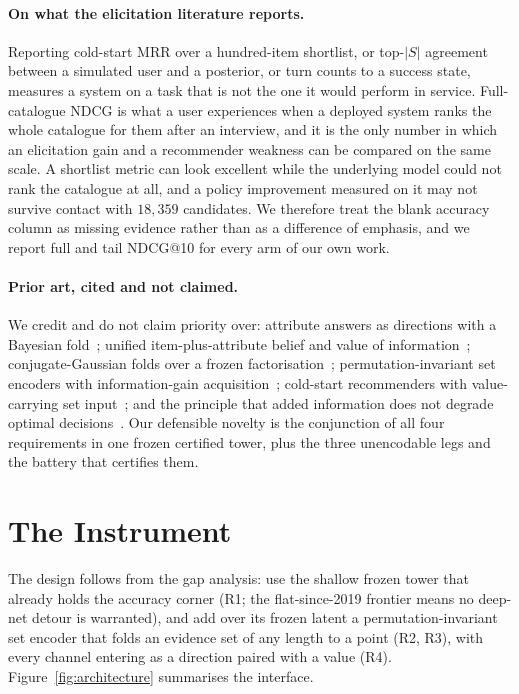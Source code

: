 \documentclass[acmsmall,review,anonymous]{acmart}
\begin{document}
\paragraph{On what the elicitation literature reports.} Reporting cold-start MRR over a hundred-item shortlist, or top-$|S|$ agreement between a simulated user and a posterior, or turn counts to a success state, measures a system on a task that is not the one it would perform in service. Full-catalogue NDCG is what a user experiences when a deployed system ranks the whole catalogue for them after an interview, and it is the only number in which an elicitation gain and a recommender weakness can be compared on the same scale. A shortlist metric can look excellent while the underlying model could not rank the catalogue at all, and a policy improvement measured on it may not survive contact with $18{,}359$ candidates. We therefore treat the blank accuracy column as missing evidence rather than as a difference of emphasis, and we report full and tail NDCG@10 for every arm of our own work.

\paragraph{Prior art, cited and not claimed.} We credit and do not claim priority over: attribute answers as directions with a Bayesian fold~\citep{biyik2023soft}; unified item-plus-attribute belief and value of information~\citep{biyik2023soft,li2021seamlessly}; conjugate-Gaussian folds over a frozen factorisation~\citep{toroghi2023bcie}; permutation-invariant set encoders with information-gain acquisition~\citep{ma2019eddi}; cold-start recommenders with value-carrying set input~\citep{lin2021tanp}; and the principle that added information does not degrade optimal decisions~\citep{good1967principle,blackwell1953equivalent}. Our defensible novelty is the conjunction of all four requirements in one frozen certified tower, plus the three unencodable legs and the battery that certifies them.

\section{The Instrument}\label{sec:method}

The design follows from the gap analysis: use the shallow frozen tower that already holds the accuracy corner (R1; the flat-since-2019 frontier means no deep-net detour is warranted), and add over its frozen latent a permutation-invariant set encoder that folds an evidence set of any length to a point (R2, R3), with every channel entering as a direction paired with a value (R4). Figure~\ref{fig:architecture} summarises the interface.
\end{document}
